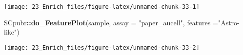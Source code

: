 \documentclass[
]{article}
\newenvironment{Shaded}{\begin{snugshade}}{\end{snugshade}}
\newcommand{\AttributeTok}[1]{\textcolor[rgb]{0.13,0.29,0.53}{#1}}
\newcommand{\FunctionTok}[1]{\textcolor[rgb]{0.13,0.29,0.53}{\textbf{#1}}}
\newcommand{\NormalTok}[1]{#1}
\newcommand{\SpecialCharTok}[1]{\textcolor[rgb]{0.81,0.36,0.00}{\textbf{#1}}}
\newcommand{\StringTok}[1]{\textcolor[rgb]{0.31,0.60,0.02}{#1}}
\begin{document}
\texttt{[image: 23\_Enrich\_files/figure-latex/unnamed-chunk-33-1]}

\begin{Shaded}
\begin{Highlighting}[]
\NormalTok{SCpubr}\SpecialCharTok{::}\FunctionTok{do\_FeaturePlot}\NormalTok{(sample, }\AttributeTok{assay =} \StringTok{"paper\_aucell"}\NormalTok{, }\AttributeTok{features =}\StringTok{"Astro{-}like"}\NormalTok{)}
\end{Highlighting}
\end{Shaded}

\texttt{[image: 23\_Enrich\_files/figure-latex/unnamed-chunk-33-2]}
\end{document}
